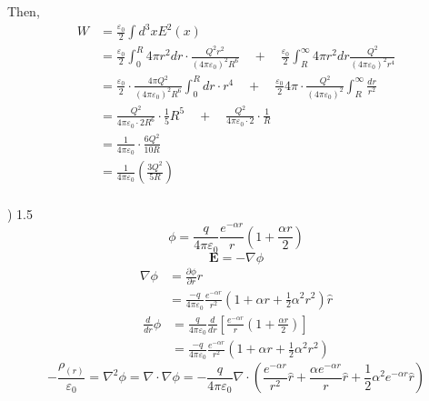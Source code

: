 \documentclass[letterpage]{article}
\begin{document}
Then,
\begin{align*}
  W &= \frac{\varepsilon_0}{2} \int d^3x E^2(x)\\
  &= \frac{\varepsilon_0}{2} \int_0^R 4\pi r^2 dr \cdot 
  \frac{Q^2 r^2}{\left(4\pi \varepsilon_0 \right)^2 R^6} \quad + \quad 
  \frac{\varepsilon_0}{2}
  \int_R^\infty 4\pi r^2 dr \frac{Q^2}{\left(4\pi \varepsilon_0 \right)^2 r^4}\\
  &= \frac{\varepsilon_0}{2} \cdot \frac{4\pi Q^2}
  {\left(4\pi \varepsilon_0 \right)^2 R^6} \int_0^R dr \cdot r^4 \quad + \quad
  \frac{\varepsilon_0}{2} 4\pi \cdot \frac{Q^2}{(4\pi \varepsilon_0)^2}
  \int_R^\infty \frac{dr}{r^2}\\
  &= \frac{Q^2}{4\pi \varepsilon_0 \cdot 2R^6} \cdot \frac{1}{5} R^5 \quad +
  \quad \frac{Q^2}{4\pi \varepsilon_0 \cdot 2} \cdot \frac{1}{R}\\
  &= \frac{1}{4\pi \varepsilon_0} \cdot \frac{6Q^2}{10R}\\
  &= \frac{1}{4\pi \varepsilon_0} \left(\frac{3Q^2}{5R}\right)
\end{align*}\\
) 1.5
\begin{equation*}
  \phi = \frac{q}{4\pi \varepsilon_0} \frac{e^{-\alpha r}}{r} 
  \left(1+ \frac{\alpha r}{2} \right)
\end{equation*}
\begin{equation*}
  \textbf{E} = -\nabla \phi
\end{equation*}
\begin{align*}
  \nabla \phi &= \frac{\partial \phi}{\partial r} \hat{r}\\
  &= \frac{-q}{4\pi \varepsilon_0} \frac{e^{-\alpha r}}{r^2} 
  \left(1 + \alpha r + \frac{1}{2} \alpha ^2 r^2 \right) \hat{r}
\end{align*}
\begin{align*}
  \frac{d}{dr} \phi &= \frac{q}{4\pi \varepsilon_0} \frac{d}{dr} 
  \left[\frac{e^{-\alpha r}}{r} \left(1+\frac{\alpha r}{2} \right)\right]\\
  &= \frac{-q}{4\pi \varepsilon_0} \frac{e^{-\alpha r}}{r^2} 
  \left(1+\alpha r + \frac{1}{2} \alpha ^2 r^2 \right)
\end{align*}
\begin{equation*}
  -\frac{\rho_{(r)}}{\varepsilon_0} = \nabla ^2 \phi = 
  \nabla \cdot \nabla \phi
  = -\frac{q}{4\pi \varepsilon_0} \nabla \cdot
  \left(\frac{e^{-\alpha r}}{r^2} \hat{r}+ \frac{\alpha e^{-\alpha r}}{r}
  \hat{r} + \frac{1}{2} \alpha ^2 e^{-\alpha r} \hat{r} \right)
\end{equation*}
\end{document}
